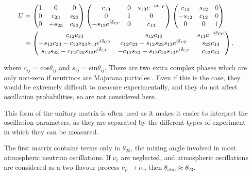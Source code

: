 \begin{equation}
\begin{aligned}
U & =
\begin{pmatrix}
1 & 0 & 0\\
0 & c_{23} & s_{23}\\
0 & -s_{23} & c_{23}\\
\end{pmatrix}
\begin{pmatrix}
c_{13} & 0 & s_{13}e^{-i\deltacp}\\
0 & 1 & 0\\
-s_{13}e^{i\deltacp} & 0 & c_{13}\\
\end{pmatrix}
\begin{pmatrix}
c_{12} & s_{12} & 0\\
-s_{12} & c_{12} & 0\\
0 & 0 & 1\\
\end{pmatrix}
\\& =
\begin{pmatrix}
c_{12}c_{13} & s_{12}c_{13} & s_{13}e^{-i\deltacp}\\
-s_{12}c_{23} - c_{12}s_{23}s_{13}e^{i\deltacp} & c_{12}c_{23}-s_{12}s_{23}s_{13}e^{i\deltacp} & s_{23}c_{13} \\
s_{12}s_{23} - c_{12}c_{23}s_{13}e^{i\deltacp} & -c_{12}s_{23} - s_{12}c_{23}s_{13}e^{i\deltacp} & c_{23}c_{13} \\
\end{pmatrix},
\end{aligned}
\vspace{10pt}
\end{equation}

where $c_{ij}$ = cos$\theta_{ij}$ and $s_{ij}$ = sin$\theta_{ij}$. There are two extra complex phases which are only non-zero if neutrinos are Majorana particles \cite{majorana}. Even if this is the case, they would be extremely difficult to measure experimentally, and they do not affect oscillation probabilities, so are not considered here.

This form of the unitary matrix is often used as it makes it easier to interpret the oscillation parameters, as they are separated by the different types of experiment in which they can be measured. 

The first matrix contains terms only in $\theta_{23}$, the mixing angle involved in most atmospheric neutrino oscillations. If $\nu_e$ are neglected, and atmospheric oscillations are considered as a two flavour process $\nu_\mu \rightarrow \nu_\tau$, then $\theta_{atm} \approx \theta_{23}$.

